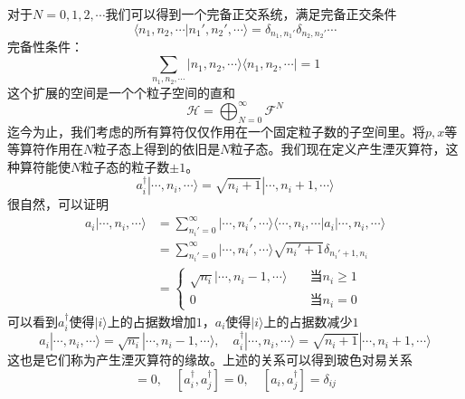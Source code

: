 \documentclass[12pt]{article}
\begin{document}
对于$N=0,1,2,\cdots$我们可以得到一个完备正交系统，满足完备正交条件
\begin{equation*}
    \langle n_1,n_2,\cdots|n_1',n_2',\cdots\rangle=\delta_{n_1,n_1'}\delta_{n_2,n_2'}\cdots
\end{equation*}
完备性条件：
\begin{equation*}
    \sum_{n_1,n_2,\cdots}|n_1,n_2,\cdots\rangle\langle n_1,n_2,\cdots|=1
\end{equation*}
这个扩展的空间是一个个粒子空间的直和
\begin{equation*}
    \mathcal{H}=\bigoplus_{N=0}^{\infty}\mathcal{F}^{N}
\end{equation*}
迄今为止，我们考虑的所有算符仅仅作用在一个固定粒子数的子空间里。将$p,x$等等算符作用在$N$粒子态上得到的依旧是$N$粒子态。我们现在定义产生湮灭算符，这种算符能使$N$粒子态的粒子数$\pm1$。
\begin{equation*}
    a_i^\dagger|\cdots,n_i,\cdots\rangle=\sqrt{n_i+1}|\cdots,n_i+1,\cdots\rangle
\end{equation*}
很自然，可以证明
\begin{equation*}
    \begin{split}
        a_i|\cdots,n_i,\cdots\rangle&=\sum_{n_i'=0}^{\infty}|\cdots,n_i',\cdots\rangle\langle\cdots,n_i,\cdots|a_i|\cdots,n_i,\cdots\rangle\\
        &=\sum_{n_i'=0}^{\infty}|\cdots,n_i',\cdots\rangle\sqrt{n_i'+1}\delta_{n_i'+1,n_i}\\
        &=\begin{cases}
            \sqrt{n_i}|\cdots,n_i-1,\cdots\rangle&\quad\text{当}n_i\geq 1\\
            0&\quad\text{当}n_i=0
        \end{cases}
    \end{split}
\end{equation*}
可以看到$a_i^\dagger$使得$|i\rangle$上的占据数增加$1$，$a_i$使得$|i\rangle$上的占据数减少$1$
\begin{equation*}
    a_i|\cdots,n_i,\cdots\rangle=\sqrt{n_i}|\cdots,n_i-1,\cdots\rangle,\quad a_i^\dagger|\cdots,n_i,\cdots\rangle=\sqrt{n_i+1}|\cdots,n_i+1,\cdots\rangle
\end{equation*}
这也是它们称为产生湮灭算符的缘故。上述的关系可以得到玻色对易关系
\begin{equation*}
    [a_i,a_j]=0,\quad [a_i^\dagger,a_j^\dagger]=0,\quad [a_i,a_j^\dagger]=\delta_{ij}
\end{equation*}
\end{document}
